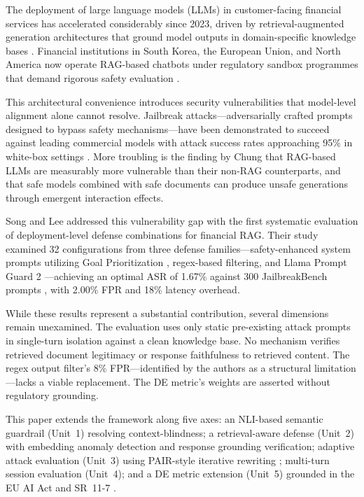 \documentclass[journal,10pt]{IEEEtran}
\begin{document}
The deployment of large language models (LLMs) in customer-facing financial services has accelerated considerably since 2023, driven by retrieval-augmented generation architectures that ground model outputs in domain-specific knowledge bases \cite{lewis2020retrieval, gao2024retrieval}. Financial institutions in South Korea, the European Union, and North America now operate RAG-based chatbots under regulatory sandbox programmes that demand rigorous safety evaluation \cite{fsc2025regulatory, darji2024rag}.

This architectural convenience introduces security vulnerabilities that model-level alignment alone cannot resolve. Jailbreak attacks---adversarially crafted prompts designed to bypass safety mechanisms---have been demonstrated to succeed against leading commercial models with attack success rates approaching 95\% in white-box settings \cite{zou2023universal}. More troubling is the finding by Chung \cite{chung2025empirical} that RAG-based LLMs are measurably more vulnerable than their non-RAG counterparts, and that safe models combined with safe documents can produce unsafe generations through emergent interaction effects.

Song and Lee \cite{song2026defending} addressed this vulnerability gap with the first systematic evaluation of deployment-level defense combinations for financial RAG. Their study examined 32 configurations from three defense families---safety-enhanced system prompts utilizing Goal Prioritization \cite{zhang2024defending}, regex-based filtering, and Llama Prompt Guard 2 \cite{inan2023llama}---achieving an optimal ASR of 1.67\% against 300 JailbreakBench prompts \cite{chao2024jailbreakbench}, with 2.00\% FPR and 18\% latency overhead.

While these results represent a substantial contribution, several dimensions remain unexamined. The evaluation uses only static pre-existing attack prompts in single-turn isolation against a clean knowledge base. No mechanism verifies retrieved document legitimacy or response faithfulness to retrieved content. The regex output filter's 8\% FPR---identified by the authors as a structural limitation---lacks a viable replacement. The DE metric's weights are asserted without regulatory grounding.

This paper extends the framework along five axes: an NLI-based semantic guardrail (Unit~1) resolving context-blindness; a retrieval-aware defense (Unit~2) with embedding anomaly detection and response grounding verification; adaptive attack evaluation (Unit~3) using PAIR-style iterative rewriting \cite{chao2023jailbreaking}; multi-turn session evaluation (Unit~4); and a DE metric extension (Unit~5) grounded in the EU AI Act \cite{euaiact2024} and SR~11-7 \cite{federalreserve2011sr}.
\end{document}
